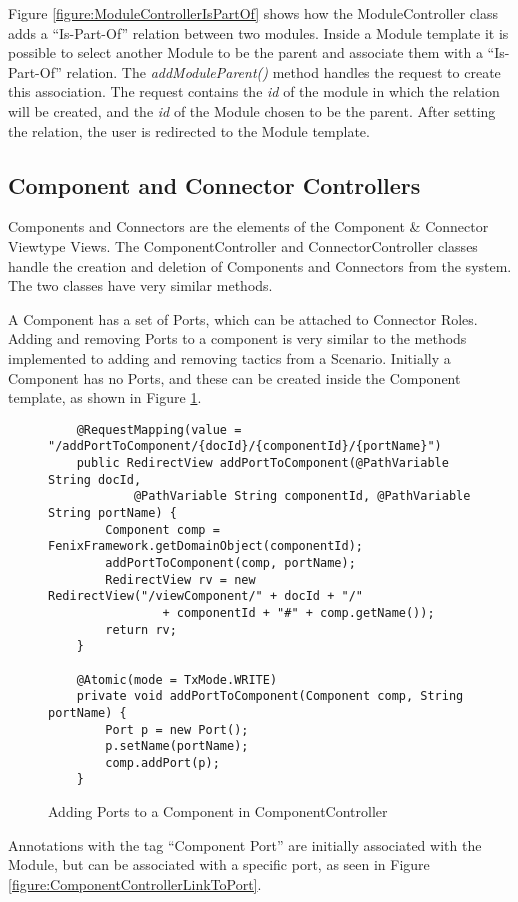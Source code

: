 Figure \ref{figure:ModuleControllerIsPartOf} shows how the ModuleController class adds a ``Is-Part-Of'' relation between two modules. Inside a Module template it is possible to select another Module to be the parent and associate them with a ``Is-Part-Of'' relation. The \textit{addModuleParent()} method handles the request to create this association. The request contains the \textit{id} of the module in which the relation will be created, and the \textit{id} of the Module chosen to be the parent. After setting the relation, the user is redirected to the Module template.

\subsection{Component and Connector Controllers}

Components and Connectors are the elements of the Component \& Connector Viewtype Views. The ComponentController and ConnectorController classes handle the creation and deletion of Components and Connectors from the system. The two classes have very similar methods.

A Component has a set of Ports, which can be attached to Connector Roles. Adding and removing Ports to a component is very similar to the methods implemented to adding and removing tactics from a Scenario. Initially a Component has no Ports, and these can be created inside the Component template, as shown in Figure \ref{figure:ComponentControllerAddingPorts}. 
\begin{figure}[h]
\lstset{style=customjava}
\begin{lstlisting}
	@RequestMapping(value = "/addPortToComponent/{docId}/{componentId}/{portName}")
	public RedirectView addPortToComponent(@PathVariable String docId,
			@PathVariable String componentId, @PathVariable String portName) {
		Component comp = FenixFramework.getDomainObject(componentId);
		addPortToComponent(comp, portName);
		RedirectView rv = new RedirectView("/viewComponent/" + docId + "/"
				+ componentId + "#" + comp.getName());
		return rv;
	}

	@Atomic(mode = TxMode.WRITE)
	private void addPortToComponent(Component comp, String portName) {
		Port p = new Port();
		p.setName(portName);
		comp.addPort(p);
	}
\end{lstlisting}
\caption{Adding Ports to a Component in ComponentController}
\label{figure:ComponentControllerAddingPorts}
\end{figure}

Annotations with the tag ``Component Port'' are initially associated with the Module, but can be associated with a specific port, as seen in Figure \ref{figure:ComponentControllerLinkToPort}. 

